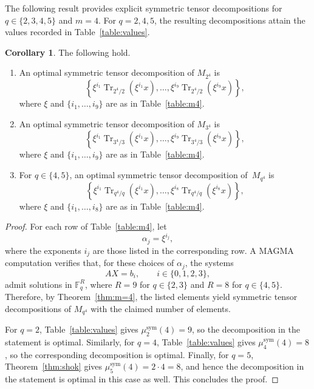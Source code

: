 \documentclass[11pt,a4paper,reqno]{article}
\numberwithin{equation}{section}
\theoremstyle{definition}
\newtheorem{corollary}[theorem]{Corollary}
\begin{document}
The following result provides explicit symmetric tensor decompositions for \(q\in\{2,3,4,5\}\) and \(m=4\). For \(q=2,4,5\), the resulting decompositions
attain the values recorded in Table~\ref{table:values}.

\begin{corollary}\label{cor:m=4}
The following hold.
\begin{enumerate}
    \item An optimal symmetric
    tensor decomposition of \(M_{2^4}\) is
    \[
    \left\{
    \xi^{i_1}\operatorname{Tr}_{2^4/2}(\xi^{i_1}x),
    \ldots,
    \xi^{i_9}\operatorname{Tr}_{2^4/2}(\xi^{i_9}x)
    \right\},
    \]
    where \(\xi\) and \(\{i_1,\ldots,i_9\}\) are as in
    Table~\ref{table:m4}.

    \item An optimal symmetric tensor decomposition of \(M_{3^4}\) is
    \[
    \left\{
    \xi^{i_1}\operatorname{Tr}_{3^4/3}(\xi^{i_1}x),
    \ldots,
    \xi^{i_9}\operatorname{Tr}_{3^4/3}(\xi^{i_9}x)
    \right\},
    \]
    where \(\xi\) and \(\{i_1,\ldots,i_9\}\) are as in
    Table~\ref{table:m4}.

    \item  For $q\in\{4,5\}$, an optimal symmetric tensor decomposition of~\(M_{q^4}\) is
    \[
    \left\{
    \xi^{i_1}\operatorname{Tr}_{q^4/q}(\xi^{i_1}x),
    \ldots,
    \xi^{i_8}\operatorname{Tr}_{q^4/q}(\xi^{i_8}x)
    \right\},
    \]
    where \(\xi\) and \(\{i_1,\ldots,i_8\}\) are as in
    Table~\ref{table:m4}.
\end{enumerate}
\end{corollary}

\begin{proof}
For each row of Table~\ref{table:m4}, let
\[
\alpha_j=\xi^{i_j},
\]
where the exponents \(i_j\) are those listed in the corresponding row. A MAGMA
computation verifies that, for these choices of \(\alpha_j\), the systems
\[
AX=b_i,\qquad i\in\{0,1,2,3\},
\]
admit solutions in \(\mathbb F_q^R\), where \(R=9\) for \(q\in\{2,3\}\) and
\(R=8\) for \(q\in\{4,5\}\). Therefore, by Theorem~\ref{thm:m=4}, the
listed elements yield symmetric tensor decompositions of \(M_{q^4}\) with the
claimed number of elements.

For \(q=2\), Table~\ref{table:values} gives $\mu^{\mathrm{sym}}_2(4)=9$, so the decomposition in the statement is optimal. Similarly, for \(q=4\),
Table~\ref{table:values} gives $\mu^{\mathrm{sym}}_4(4)=8$, so the corresponding decomposition is optimal. Finally, for \(q=5\),
Theorem~\ref{thm:shok} gives $\mu^{\mathrm{sym}}_5(4)=2\cdot 4=8$, and hence the decomposition in the statement is optimal in this case as well. This concludes the proof.
\end{proof}
\end{document}
